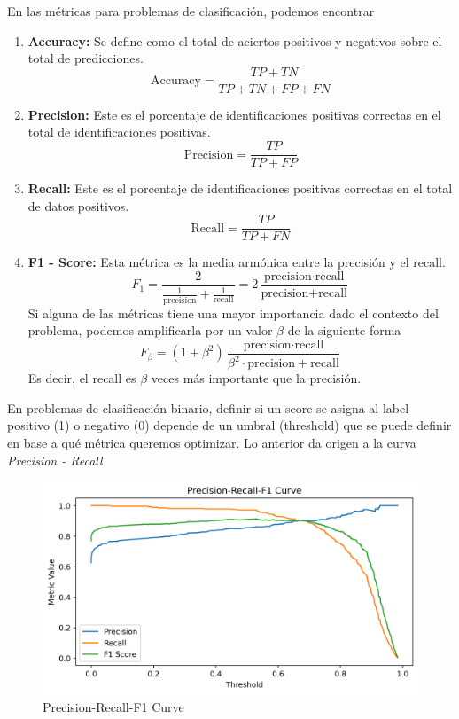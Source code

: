 En las métricas para problemas de clasificación, podemos encontrar
\begin{enumerate}
    \item \textbf{Accuracy:} Se define como el total de aciertos positivos y negativos sobre el total de predicciones. 
    $$ 
    \text{Accuracy} = \frac{TP + TN}{TP + TN + FP + FN}
    $$
    \item \textbf{Precision:} Este es el porcentaje de identificaciones positivas correctas en el total de identificaciones positivas. 
    $$
    \text{Precision} = \frac{TP}{TP + FP}
    $$
    \item \textbf{Recall: } Este es el porcentaje de identificaciones positivas correctas en el total de datos positivos. 
    $$ 
    \text{Recall} = \frac{TP}{TP + FN}
    $$
    \item \textbf{F1 - Score: } Esta métrica es la media armónica entre la precisión y el recall. 
    $$ 
    F_{1} = \frac{2}{\frac{1}{\text{precision}} + \frac{1}{\text{recall}}} = 2 \frac{\text{precision} \cdot \text{recall}}{\text{precision} + \text{recall}}
    $$
    Si alguna de las métricas tiene una mayor importancia dado el contexto del problema, podemos amplificarla por un valor $\beta$ de la siguiente forma
    $$ 
    F_{\beta} = (1 + \beta^2) \frac{\text{precision} \cdot \text{recall}}{\beta^2 \cdot \text{precision} + \text{recall}}
    $$
    Es decir, el recall es $\beta$ veces más importante que la precisión. 
\end{enumerate}

En problemas de clasificación binario, definir si un score se asigna al label positivo (1) o negativo (0) depende de un umbral (threshold) que se puede definir en base a qué métrica queremos optimizar. Lo anterior da origen a la curva \textit{Precision - Recall}

\begin{figure}[H]
    \center
    \includegraphics[scale=0.5]{notebooks/Others/img/precision_recall_f1_curve.png}
    \caption{Precision-Recall-F1 Curve}
\end{figure}

